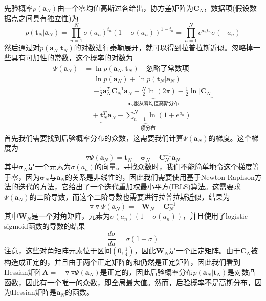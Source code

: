 先验概率$p(\boldsymbol{a}_N)$由一个零均值高斯过各给出，协方差矩阵为$\boldsymbol{C}_N$，数据项(假设数据点之间具有独立性)为
\begin{equation}
	p(\boldsymbol{t}_N|\boldsymbol{a}_N)=\prod_{n=1}^{N}\sigma(a_n)^{t_n}(1-\sigma(a_n))^{1-t_n}=\prod_{n=1}^{N}e^{a_nt_n}\sigma(-a_n)
\end{equation}
然后通过对$p(\boldsymbol{a}_N|\boldsymbol{t}_N)$的对数进行泰勒展开，就可以得到拉普拉斯近似。忽略掉一些具有可加性的常数，这个概率的对数为
\begin{equation}
\begin{aligned}
	\Psi(\boldsymbol{a}_N)&=\ln p(\boldsymbol{a}_N,\boldsymbol{t}_N)\quad \text{忽略了常数项}\\
	&=\ln p(\boldsymbol{a}_N)+\ln p(\boldsymbol{t}_N|\boldsymbol{a}_N)\\
	&=\underbrace{-\frac{1}{2}\boldsymbol{a}_N^T\boldsymbol{C}_N^{-1}\boldsymbol{a}_N-\frac{N}{2}\ln (2\pi)-\frac{1}{2}\ln |\boldsymbol{C}_N|}_{\text{$\boldsymbol{a}_N$服从零均值高斯分布}}\\
	&\quad  +\underbrace{\boldsymbol{t}_N^T\boldsymbol{a}_N-\sum_{n=1}^{N}\ln (1+e^{a_n})}_{\text{二项分布}}
\end{aligned}
\end{equation}
首先我们需要找到后验概率分布的众数，这需要我们计算$\Psi (\boldsymbol{a}_N)$的梯度。这个梯度为
\begin{equation}
	\triangledown \Psi(\boldsymbol{a}_N)=\boldsymbol{t}_N-\boldsymbol{\sigma}_N-\boldsymbol{C}_N^{-1}\boldsymbol{a}_N
\end{equation}
其中$\boldsymbol{\sigma}_N$是一个元素为$\sigma(a_n)$的向量。寻找众数时，我们不能简单地令这个梯度等于零，因为$\boldsymbol{\sigma}_N$与$\boldsymbol{a}_N$的关系是非线性的，因此我们需要使用基于Newton-Raphson方法的迭代的方法，它给出了一个迭代重加权最小平方(IRLS)算法。这需要求$\Psi(\boldsymbol{a}_N)$的二阶导数，而这个二阶导数也需要进行拉普拉斯近似，结果为
\begin{equation}
	\triangledown\triangledown \Psi(\boldsymbol{a}_N)=-\boldsymbol{W}_N-\boldsymbol{C}_N^{-1}
\end{equation}
其中$\boldsymbol{W}_N$是一个对角矩阵，元素为$\sigma(a_n)(1-\sigma(a_n))$，并且使用了logistic sigmoid函数的导数的结果
\begin{equation}
	\frac{d\sigma}{da}=\sigma(1-\sigma)
\end{equation}
注意，这些对角矩阵元素位于区间$(0,\frac{1}{4})$，因此$\boldsymbol{W}_N$是一个正定矩阵。由于$\boldsymbol{C}_N$被构造成正定的，并且由于两个正定矩阵的和仍然是正定矩阵，因此我们看到Hessian矩阵$\boldsymbol{A}=-\triangledown\triangledown \Psi(\boldsymbol{a}_N)$是正定的，因此后验概率分布$p(\boldsymbol{a}_N|\boldsymbol{t}_N)$是对数凸函数，因此有一个唯一的众数，即全局最大值。然而，后验概率不是高斯分布，因为Hessian矩阵是$\boldsymbol{a}_N$的函数。

